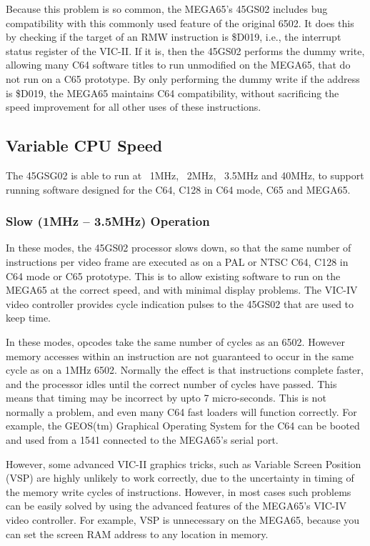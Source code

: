 Because this problem is so common, the MEGA65's 45GS02 includes bug compatibility with this
commonly used feature of the original 6502.  It does this by checking if the target of an RMW
instruction is \$D019, i.e., the interrupt status register of the VIC-II.  If it is, then
the 45GS02 performs the dummy write, allowing many C64 software titles to run unmodified on the
MEGA65, that do not run on a C65 prototype.  By only performing the dummy write if the address
is \$D019, the MEGA65 maintains C64 compatibility, without sacrificing the speed improvement
for all other uses of these instructions.

\subsection{Variable CPU Speed}

The 45GSG02 is able to run at ~1MHz, ~2MHz, ~3.5MHz and 40MHz, to support running software
designed for the C64, C128 in C64 mode, C65 and MEGA65.

\subsubsection{Slow (1MHz -- 3.5MHz) Operation}
In these modes, the 45GS02 processor slows down, so that the same number of instructions
per video frame are executed as on a PAL or NTSC C64, C128 in C64 mode or C65 prototype.
This is to allow existing software to run on the MEGA65 at the correct speed, and with
minimal display problems.  The VIC-IV video controller provides cycle indication pulses
to the 45GS02 that are used to keep time.

In these modes, opcodes take the same number of cycles as an 6502.  However memory accesses within an
instruction are not guaranteed to occur in the same cycle as on a 1MHz 6502.  Normally
the effect is that instructions complete faster, and the processor idles until the
correct number of cycles have passed. This means that timing may be incorrect by upto
7 micro-seconds.  This is not normally a problem, and even many C64 fast loaders will
function correctly. For example, the GEOS(tm) Graphical Operating System for the C64
can be booted and used from a 1541 connected to the MEGA65's serial port.

However, some advanced VIC-II graphics tricks, such as Variable Screen Position (VSP) are
highly unlikely to work correctly, due to the uncertainty in timing of the memory write
 cycles of instructions.  However, in most cases such problems can be easily solved by using
the advanced features of the MEGA65's VIC-IV video controller.  For example, VSP is unnecessary
on the MEGA65, because you can set the screen RAM address to any location in memory.


